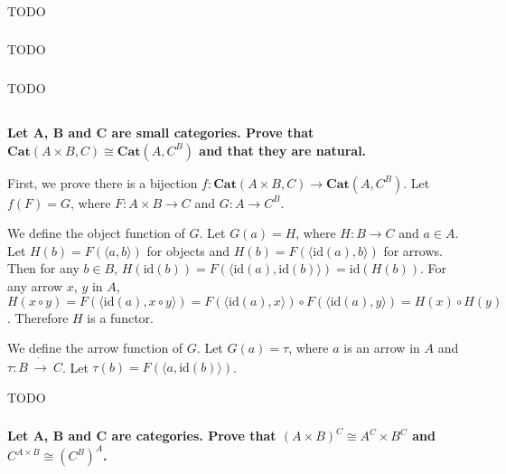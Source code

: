 \documentclass{article}
\begin{document}
\subsubsection{}
TODO

\subsubsection{}
TODO

\subsubsection{}
TODO

\subsection{}

\subsubsection{}

\textbf{Let A, B and C are small categories. Prove that $\mathbf{Cat}(A \times B, C) \cong \mathbf{Cat}(A, C^B)$ and that they are natural.}

First, we prove there is a bijection $f : \mathbf{Cat}(A \times B, C) \rightarrow \mathbf{Cat}(A, C^B)$. Let $f(F) = G$, where $F : A \times B \rightarrow C$ and $G : A \rightarrow C^B$.

We define the object function of $G$. Let $G(a) = H$, where $H : B \rightarrow C$ and $a \in A$. Let $H(b) = F(\langle a, b \rangle)$ for objects and $H(b) = F(\langle \mathrm{id}(a), b \rangle)$ for arrows. Then for any $b \in B$, $H(\mathrm{id}(b)) = F(\langle \mathrm{id}(a), \mathrm{id}(b) \rangle) = \mathrm{id}(H(b))$. For any arrow $x$, $y$ in $A$, $H(x \circ y) = F(\langle \mathrm{id}(a), x \circ y \rangle) = F(\langle \mathrm{id}(a), x \rangle) \circ F(\langle \mathrm{id}(a), y \rangle) = H(x) \circ H(y)$. Therefore $H$ is a functor.

We define the arrow function of $G$. Let $G(a) = \tau$, where $a$ is an arrow in $A$ and $\tau : B\ \dot{\rightarrow}\ C$. Let $\tau(b) = F(\langle a, \mathrm{id}(b) \rangle)$.

TODO

\subsubsection{}

\textbf{Let A, B and C are categories. Prove that $(A \times B)^C \cong A^C \times B^C$ and $C^{A \times B} \cong (C^B)^A$.}
\end{document}
